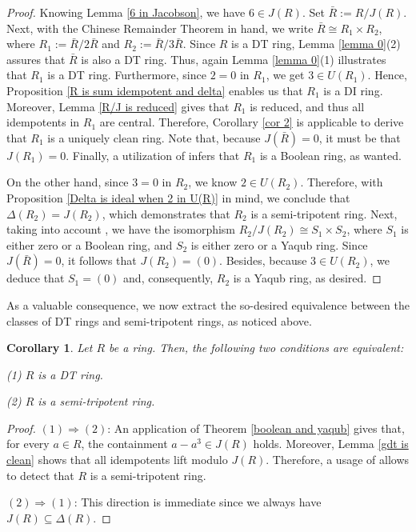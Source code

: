 \documentclass[12pt]{amsart}
\newtheorem{corollary}[theorem]{Corollary}
\theoremstyle{definition}
\begin{document}
\begin{proof}
Knowing Lemma \ref{6 in Jacobson}, we have \(6 \in J(R)\). Set \(\bar{R} := R/J(R)\). Next, with the Chinese Remainder Theorem in hand, we write \(\bar{R} \cong R_1 \times R_2\), where \(R_1 := \bar{R}/2\bar{R}\) and \(R_2 := \bar{R}/3\bar{R}\). Since \(R\) is a DT ring, Lemma \ref{lemma 0}(2) assures that \(\bar{R}\) is also a DT ring. Thus, again Lemma \ref{lemma 0}(1) illustrates that \(R_1\) is a DT ring. Furthermore, since \(2 = 0\) in \(R_1\), we get \(3 \in U(R_1)\). Hence, Proposition \ref{R is sum idempotent and delta} enables us that \(R_1\) is a DI ring. Moreover, Lemma \ref{R/J is reduced} gives that \(R_1\) is reduced, and thus all idempotents in \(R_1\) are central. Therefore, Corollary \ref{cor 2} is applicable to derive that \(R_1\) is a uniquely clean ring. Note that, because \(J(\bar{R}) = 0\), it must be that \(J(R_1) = 0\). Finally, a utilization of \cite[Theorem 19]{nzu} infers that \(R_1\) is a Boolean ring, as wanted.

On the other hand, since $3=0$ in $R_2$, we know $2 \in U(R_2)$. Therefore, with Proposition \ref{Delta is ideal when 2 in U(R)} in mind, we conclude that $\Delta(R_2)=J(R_2)$, which demonstrates that $R_2$ is a semi-tripotent ring. Next, taking into account \cite[Theorem 3.5]{kyzr}, we have the isomorphism $R_2/J(R_2)\cong S_1 \times S_2$, where $S_1$ is either zero or a Boolean ring, and $S_2$ is either zero or a Yaqub ring. Since $J(\bar{R})=0$, it follows that $J(R_2)=(0)$. Besides, because $3 \in U(R_2)$, we deduce that $S_1=(0)$ and, consequently, $R_2$ is a Yaqub ring, as desired.
\end{proof}

As a valuable consequence, we now extract the so-desired equivalence between the classes of DT rings and semi-tripotent rings, as noticed above. 

\begin{corollary}\label{gdt iff semi tripotent}
Let $R$ be a ring. Then, the following two conditions are equivalent:

(1) $R$ is a DT ring.

(2) $R$ is a semi-tripotent ring.
\end{corollary}

\begin{proof}
$(1) \Rightarrow (2)$: An application of Theorem \ref{boolean and yaqub} gives that, for every $a \in R$, the containment $a-a^3 \in J(R)$ holds. Moreover, Lemma \ref{gdt is clean} shows that all idempotents lift modulo $J(R)$. Therefore, a usage of \cite[Theorem 3.5]{kyzr} allows to detect that $R$ is a semi-tripotent ring.

$(2) \Rightarrow (1)$: This direction is immediate since we always have $J(R) \subseteq \Delta(R)$.
\end{proof}
\end{document}
